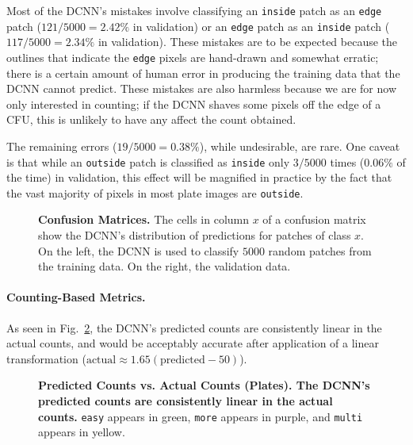 \documentclass[10pt,letterpaper]{article}
\begin{document}
            Most of the DCNN's mistakes involve classifying an \texttt{inside} patch as an \texttt{edge} patch ($121 / 5000 = 2.42\%$ in validation) or an \texttt{edge} patch as an \texttt{inside} patch ($117 / 5000 = 2.34\%$ in validation). These mistakes are to be expected because the outlines that indicate the \texttt{edge} pixels are hand-drawn and somewhat erratic; there is a certain amount of human error in producing the training data that the DCNN cannot predict. These mistakes are also harmless because we are for now only interested in counting; if the DCNN shaves some pixels off the edge of a CFU, this is unlikely to have any affect the count obtained.
            
            The remaining errors ($19 / 5000 = 0.38\%$), while undesirable, are rare. One caveat is that while an \texttt{outside} patch is classified as \texttt{inside} only $3 / 5000$ times ($0.06\%$ of the time) in validation, this effect will be magnified in practice by the fact that the vast majority of pixels in most plate images are \texttt{outside}.
            
            \begin{figure}[h]
                
                
                \caption{{\bf Confusion Matrices.} The cells in column $x$ of a confusion matrix show the DCNN's distribution of predictions for patches of class $x$. On the left, the DCNN is used to classify $5000$ random patches from the training data. On the right, the validation data.}
                \label{dcnn_confusion}
            \end{figure}
        
        \paragraph*{Counting-Based Metrics.}             
            As seen in Fig.~\ref{dcnn_plate_counts}, the DCNN's predicted counts are consistently linear in the actual counts, and would be acceptably accurate after application of a linear transformation ($\text{actual} \approx 1.65(\text{predicted} - 50)$).
            
            \begin{figure}[h]
                
                \caption{{\bf Predicted Counts vs. Actual Counts (Plates). The DCNN's predicted counts are consistently linear in the actual counts.} \texttt{easy} appears in green, \texttt{more} appears in purple, and \texttt{multi} appears in yellow.}
                \label{dcnn_plate_counts}
            \end{figure}
            
\end{document}
